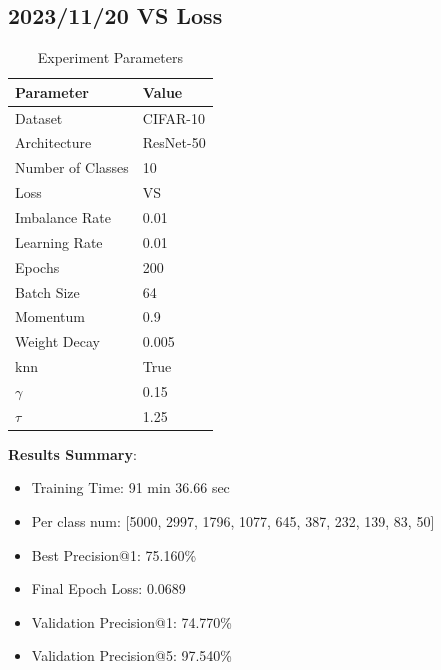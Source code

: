 \documentclass{article}
\begin{document}
\begin{multicols}{2} %
\section{2023/11/20 VS Loss}
\begin{table}[H]
\centering
\caption{Experiment Parameters}
\label{tab:parameters_vs}
\begin{tabular}{ll}
\toprule
Parameter & Value \\
\midrule
Dataset & CIFAR-10 \\
Architecture & ResNet-50 \\
Number of Classes & 10 \\
Loss & VS \\
Imbalance Rate & 0.01 \\
Learning Rate & 0.01 \\
Epochs & 200 \\
Batch Size & 64 \\
Momentum & 0.9 \\
Weight Decay & 0.005 \\
knn & True \\
\(\gamma\) & 0.15 \\
\(\tau\) & 1.25 \\
\bottomrule
\end{tabular}
\end{table}

\textbf{Results Summary}:
\begin{itemize}
    \item Training Time: 91 min 36.66 sec
    \item Per class num: [5000, 2997, 1796, 1077, 645, 387, 232, 139, 83, 50]
    \item Best Precision@1: 75.160\%
    \item Final Epoch Loss: 0.0689
    \item Validation Precision@1: 74.770\%
    \item Validation Precision@5: 97.540\%
\end{itemize}


\end{multicols}
\end{document}
